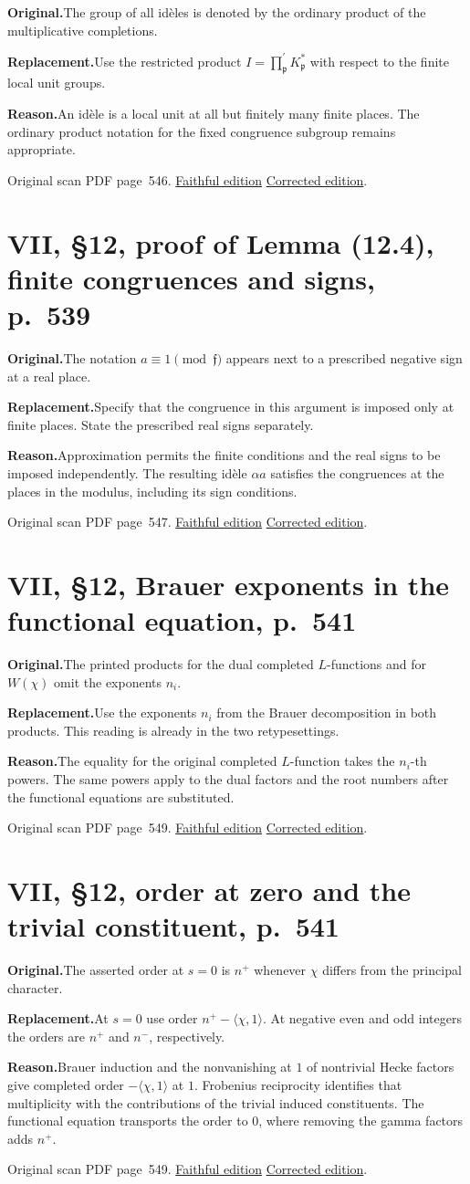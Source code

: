\documentclass[11pt,a4paper]{article}
\newcommand{\original}{\par\smallskip\noindent\textbf{Original.}\enspace}
\newcommand{\replacement}{\par\smallskip\noindent\textbf{Replacement.}\enspace}
\newcommand{\reason}{\par\smallskip\noindent\textbf{Reason.}\enspace}
\newcommand{\editionlink}[3]{\href{#1\#errata.#2}{#3}}
\newcommand{\location}[2]{%
  \par\smallskip\noindent Original scan PDF page~#2.\enspace
  \editionlink{Neukirch_Faithful.pdf}{#1}{Faithful edition}
  \quad\editionlink{Neukirch_Corrected.pdf}{#1}{Corrected edition}.}
\begin{document}
\original The group of all idèles is denoted by the ordinary product of the multiplicative completions.
\replacement Use the restricted product $I=\prod_{\mathfrak p}^{\prime}K_{\mathfrak p}^*$ with respect to the finite local unit groups.
\reason An idèle is a local unit at all but finitely many finite places. The ordinary product notation for the fixed congruence subgroup remains appropriate.
\location{164}{546}

\setcounter{section}{164}
\section{VII, \S12, proof of Lemma (12.4), finite congruences and signs, p.~539}\label{errata:item:165}

\original The notation $a\equiv1\pmod{\mathfrak f}$ appears next to a prescribed negative sign at a real place.
\replacement Specify that the congruence in this argument is imposed only at finite places. State the prescribed real signs separately.
\reason Approximation permits the finite conditions and the real signs to be imposed independently. The resulting idèle $\alpha a$ satisfies the congruences at the places in the modulus, including its sign conditions.
\location{165}{547}

\setcounter{section}{165}
\section{VII, \S12, Brauer exponents in the functional equation, p.~541}\label{errata:item:166}

\original The printed products for the dual completed $L$-functions and for $W(\chi)$ omit the exponents $n_i$.
\replacement Use the exponents $n_i$ from the Brauer decomposition in both products. This reading is already in the two retypesettings.
\reason The equality for the original completed $L$-function takes the $n_i$-th powers. The same powers apply to the dual factors and the root numbers after the functional equations are substituted.
\location{166}{549}

\setcounter{section}{166}
\section{VII, \S12, order at zero and the trivial constituent, p.~541}\label{errata:item:167}

\original The asserted order at $s=0$ is $n^+$ whenever $\chi$ differs from the principal character.
\replacement At $s=0$ use order $n^+-\langle\chi,1\rangle$. At negative even and odd integers the orders are $n^+$ and $n^-$, respectively.
\reason Brauer induction and the nonvanishing at $1$ of nontrivial Hecke factors give completed order $-\langle\chi,1\rangle$ at $1$. Frobenius reciprocity identifies that multiplicity with the contributions of the trivial induced constituents. The functional equation transports the order to $0$, where removing the gamma factors adds $n^+$.
\location{167}{549}
\end{document}
